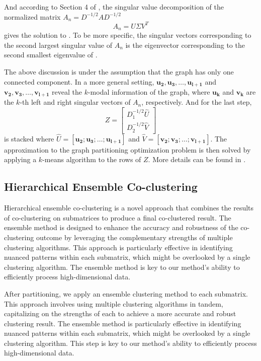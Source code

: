 And according to Section 4 of \cite{dhillon2001CoclusteringDocumentsWords}, the singular value decomposition of the normalized matrix $A_n = D^{-1/2} A D^{-1/2}$
$$A_n = U \Sigma V^T$$
gives the solution to . To be more specific, the singular vectors corresponding to the second largest singular value of $A_n$ is the eigenvector corresponding to the second smallest eigenvalue of .

The above discussion is under the assumption that the graph has only one connected component. In a more general setting, $\mathbf{u_2}, \mathbf{u_3}, \ldots, \mathbf{u_{l+1}}$ and $\mathbf{v_2}, \mathbf{v_3}, \ldots, \mathbf{v_{l+1}}$ reveal the $k$-modal information of the graph, where $\mathbf{u_k}$ and $\mathbf{v_k}$ are the $k$-th left and right singular vectors of $A_n$, respectively.
And for the last step,
$$ Z = \begin{bmatrix} D_1^{-1/2} \hat{U} \\ D_2^{-1/2} \hat{V} \end{bmatrix} $$
is stacked where $\hat{U} = [\mathbf{u_2}; \mathbf{u_3}; \ldots; \mathbf{u_{l+1}}]$ and $\hat{V} = [\mathbf{v_2}; \mathbf{v_3}; \ldots; \mathbf{v_{l+1}}]$. The approximation to the graph partitioning optimization problem is then solved by applying a $k$-means algorithm to the rows of $Z$. More details can be found in \cite{dhillon2001CoclusteringDocumentsWords}.

\subsection{Hierarchical Ensemble Co-clustering}

Hierarchical ensemble co-clustering is a novel approach that combines the results of co-clustering on submatrices to produce a final co-clustered result.
The ensemble method is designed to enhance the accuracy and robustness of the co-clustering outcome by leveraging the complementary strengths of multiple clustering algorithms. This approach is particularly effective in identifying nuanced patterns within each submatrix, which might be overlooked by a single clustering algorithm. The ensemble method is key to our method's ability to efficiently process high-dimensional data.

After partitioning, we apply an ensemble clustering method to each submatrix. This approach involves using multiple clustering algorithms in tandem, capitalizing on the strengths of each to achieve a more accurate and robust clustering result. The ensemble method is particularly effective in identifying nuanced patterns within each submatrix, which might be overlooked by a single clustering algorithm. This step is key to our method's ability to efficiently process high-dimensional data.


